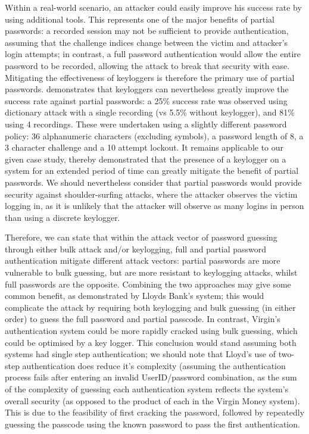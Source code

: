 \documentclass[british,11pt,a4paper]{article}
\begin{document}
Within a real-world scenario, an attacker could easily improve his success rate by using additional tools. This represents one of the major benefits of partial passwords: a recorded session may not be sufficient to provide authentication, assuming that the challenge indices change between the victim and attacker's login attempts; in contrast, a full password authentication would allow the entire password to be recorded, allowing the attack to break that security with ease. Mitigating the effectiveness of keyloggers is therefore the primary use of partial passwords. \citet{Aspinall2013-sh} demonstrates that keyloggers can nevertheless greatly improve the success rate against partial passwords: a 25\% success rate was observed using dictionary attack with a single recording (vs 5.5\% without keylogger), and 81\% using 4 recordings. These were undertaken using a slightly different password policy: 36 alphanumeric characters (excluding symbols), a password length of 8, a 3 character challenge and a 10 attempt lockout. It remains applicable to our given case study, thereby demonstrated that the presence of a keylogger on a system for an extended period of time can greatly mitigate the benefit of partial passwords. We should nevertheless consider that partial passwords would provide security against shoulder-surfing attacks, where the attacker observes the victim logging in, as it is unlikely that the attacker will observe as many logins in person than using a discrete keylogger. 

Therefore, we can state that within the attack vector of password guessing through either bulk attack and/or keylogging, full and partial password authentication mitigate different attack vectors: partial passwords are more vulnerable to bulk guessing, but are more resistant to keylogging attacks, whilst full passwords are the opposite. Combining the two approaches may give some common benefit, as demonstrated by Lloyds Bank's system; this would complicate the attack by requiring both keylogging and bulk guessing (in either order) to guess the full password and partial passcode. In contrast, Virgin's authentication system could be more rapidly cracked using bulk guessing, which could be optimised by a key logger. This conclusion would stand assuming both systems had single step authentication; we should note that Lloyd's use of two-step authentication does reduce it's complexity (assuming the authentication process fails after entering an invalid UserID/password combination, as the sum of the complexity of guessing each authentication system reflects the system's overall security (as opposed to the product of each in the Virgin Money system). This is due to the feasibility of first cracking the password, followed by repeatedly guessing the passcode using the known password to pass the first authentication.
\end{document}
